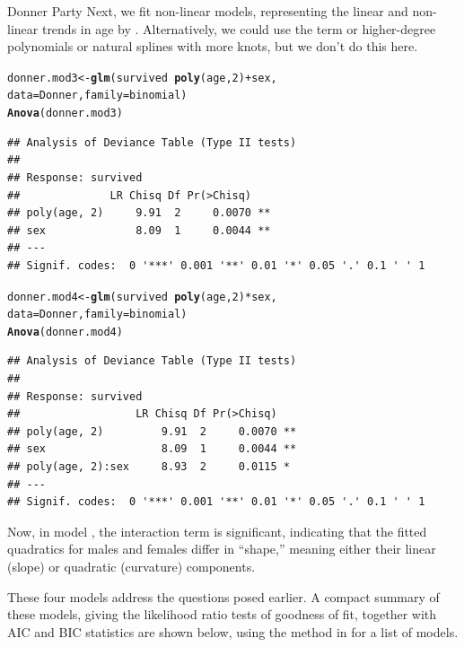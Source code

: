 \documentclass[11pt]{book}\usepackage[]{graphicx}\usepackage[]{color}
\makeatletter
\newcommand{\hlnum}[1]{\textcolor[rgb]{0.686,0.059,0.569}{#1}}%
\newcommand{\hlopt}[1]{\textcolor[rgb]{0,0,0}{#1}}%
\newcommand{\hlstd}[1]{\textcolor[rgb]{0.345,0.345,0.345}{#1}}%
\newcommand{\hlkwb}[1]{\textcolor[rgb]{0.69,0.353,0.396}{#1}}%
\newcommand{\hlkwc}[1]{\textcolor[rgb]{0.333,0.667,0.333}{#1}}%
\newcommand{\hlkwd}[1]{\textcolor[rgb]{0.737,0.353,0.396}{\textbf{#1}}}%
\newenvironment{kframe}{%
 \def\at@end@of@kframe{}%
 \ifinner\ifhmode%
  \def\at@end@of@kframe{\end{minipage}}%
  \begin{minipage}{\columnwidth}%
 \fi\fi%
 \def\FrameCommand##1{\hskip\@totalleftmargin \hskip-\fboxsep
 \colorbox{shadecolor}{##1}\hskip-\fboxsep
     \hskip-\linewidth \hskip-\@totalleftmargin \hskip\columnwidth}%
 \MakeFramed {\advance\hsize-\width
   \@totalleftmargin\z@ \linewidth\hsize
   \@setminipage}}%
 {\par\unskip\endMakeFramed%
 \at@end@of@kframe}
\newenvironment{knitrout}{}{} %
\renewenvironment{knitrout}{\small\renewcommand{\baselinestretch}{.85}}{} %
\makeatother
\begin{document}
\begin{Example}[donner1]{Donner Party}
Next, we fit non-linear models, representing the linear and non-linear
trends in age by .  Alternatively, we could use
the term  or higher-degree polynomials or 
natural splines with more knots, but we don't do this here.
\begin{knitrout}
\color{fgcolor}\begin{kframe}
\begin{alltt}
\hlstd{donner.mod3} \hlkwb{<-} \hlkwd{glm}\hlstd{(survived} \hlopt{~} \hlkwd{poly}\hlstd{(age,}\hlnum{2}\hlstd{)} \hlopt{+} \hlstd{sex,}
                   \hlkwc{data}\hlstd{=Donner,} \hlkwc{family}\hlstd{=binomial)}
\hlkwd{Anova}\hlstd{(donner.mod3)}
\end{alltt}
\begin{verbatim}
## Analysis of Deviance Table (Type II tests)
## 
## Response: survived
##              LR Chisq Df Pr(>Chisq)   
## poly(age, 2)     9.91  2     0.0070 **
## sex              8.09  1     0.0044 **
## ---
## Signif. codes:  0 '***' 0.001 '**' 0.01 '*' 0.05 '.' 0.1 ' ' 1
\end{verbatim}
\begin{alltt}
\hlstd{donner.mod4} \hlkwb{<-} \hlkwd{glm}\hlstd{(survived} \hlopt{~} \hlkwd{poly}\hlstd{(age,}\hlnum{2}\hlstd{)} \hlopt{*} \hlstd{sex,}
                   \hlkwc{data}\hlstd{=Donner,} \hlkwc{family}\hlstd{=binomial)}
\hlkwd{Anova}\hlstd{(donner.mod4)}
\end{alltt}
\begin{verbatim}
## Analysis of Deviance Table (Type II tests)
## 
## Response: survived
##                  LR Chisq Df Pr(>Chisq)   
## poly(age, 2)         9.91  2     0.0070 **
## sex                  8.09  1     0.0044 **
## poly(age, 2):sex     8.93  2     0.0115 * 
## ---
## Signif. codes:  0 '***' 0.001 '**' 0.01 '*' 0.05 '.' 0.1 ' ' 1
\end{verbatim}
\end{kframe}
\end{knitrout}
\noindent Now, in model ,  the interaction term
 is significant, indicating that the 
fitted quadratics for males and females differ in ``shape,''
meaning either their linear (slope) or quadratic (curvature)
components.

These four models address the questions posed earlier. A compact
summary of these models, giving the likelihood ratio tests
of goodness of fit, together with AIC and BIC statistics are
shown below, using the  method in 
for a list of  models.


\end{Example}
\end{document}
